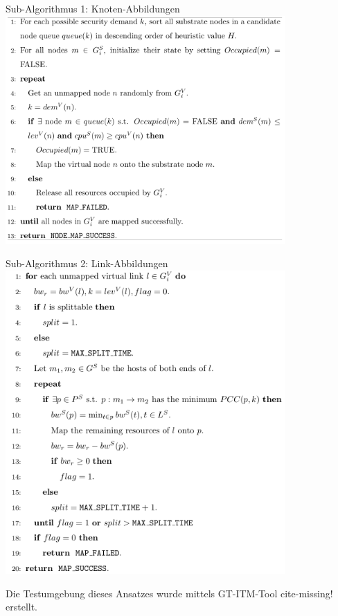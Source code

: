 \documentclass{lni}
\begin{document}
\begin{center}
Sub-Algorithmus 1: Knoten-Abbildungen\newline
	\includegraphics[width=0.8\textwidth]{nodemapping.pdf}\newline
\end{center}
\newpage
\begin{center}
Sub-Algorithmus 2: Link-Abbildungen\newline
	\includegraphics[width=0.8\textwidth]{linkmapping.pdf}\newline
\end{center}

Die Testumgebung dieses Ansatzes wurde mittels GT-ITM-Tool cite-missing! erstellt. 
\end{document}
